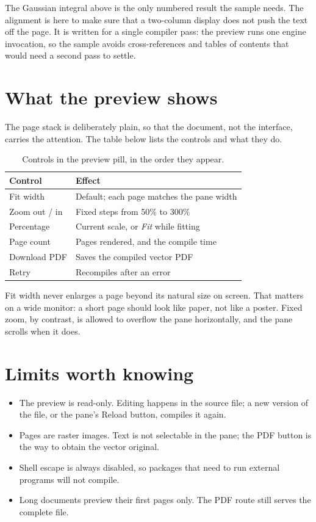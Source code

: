 \documentclass[11pt]{article}
\begin{document}
The Gaussian integral above is the only numbered result the sample needs. The
alignment is here to make sure that a two-column display does not push the text
off the page. It is written for a single compiler pass: the preview runs one
engine invocation, so the sample avoids cross-references and tables of contents
that would need a second pass to settle.

\section{What the preview shows}

The page stack is deliberately plain, so that the document, not the interface,
carries the attention. The table below lists the controls and what they do.

\begin{table}[h]
  \centering
  \begin{tabular}{ll}
    \hline
    Control & Effect \\
    \hline
    Fit width & Default; each page matches the pane width \\
    Zoom out / in & Fixed steps from 50\% to 300\% \\
    Percentage & Current scale, or \emph{Fit} while fitting \\
    Page count & Pages rendered, and the compile time \\
    Download PDF & Saves the compiled vector PDF \\
    Retry & Recompiles after an error \\
    \hline
  \end{tabular}
  \caption{Controls in the preview pill, in the order they appear.}
\end{table}

Fit width never enlarges a page beyond its natural size on screen. That matters
on a wide monitor: a short page should look like paper, not like a poster. Fixed
zoom, by contrast, is allowed to overflow the pane horizontally, and the pane
scrolls when it does.

\section{Limits worth knowing}

\begin{itemize}
  \item The preview is read-only. Editing happens in the source file; a new
        version of the file, or the pane's Reload button, compiles it again.
  \item Pages are raster images. Text is not selectable in the pane; the PDF
        button is the way to obtain the vector original.
  \item Shell escape is always disabled, so packages that need to run external
        programs will not compile.
  \item Long documents preview their first pages only. The PDF route still
        serves the complete file.
\end{itemize}
\end{document}
